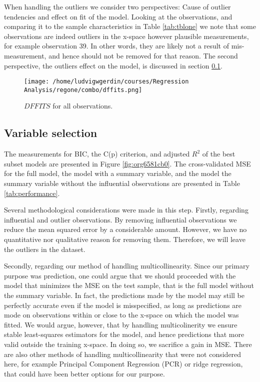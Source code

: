 \documentclass[11pt]{article}
\begin{document}
When handling the outliers we consider two perspectives: Cause of outlier tendencies and effect on fit of 
the model. Looking at the observations, and comparing it to the sample characteristics in Table \ref{tab:tblone}
we note that some observations are indeed outliers in the x-space however 
plausible measurements, for example observation 39. In other words, they are likely not a result
of mis-measurement, and hence should not be removed for that reason. The second perspective, the outliers 
effect on the model, is discussed in section \ref{sec:org46b9442}.

\begin{figure}[h]
\centering
\texttt{[image: /home/ludvigwgerdin/courses/Regression Analysis/regone/combo/dffits.png]}
\caption{\label{fig:org85084fd}
\(DFFITS\) for all observations.}
\end{figure}

\subsection{Variable selection}
\label{sec:org46b9442}

The measurements for BIC, the C(p) criterion, and adjusted \(R^2\) of the best subset models are presented
in Figure \ref{fig:org6581cb0}. The cross-validated MSE for the full model, the model with a summary variable, 
and the model the summary variable without the influential observations are presented in Table
\ref{tab:performance}. 

Several methodological considerations were made in this step. Firstly, regarding influential and outlier 
observations. By removing influential observations we reduce the mean squared error by a considerable amount.
However, we have no quantitative nor qualitative reason for removing them. Therefore, we will leave the 
outliers in the dataset. 

Secondly, regarding our method of handling multicollinearity. Since our primary purpose was prediction, 
one could argue that we should proceeded with the model that minimizes the MSE on the test sample, that is
the full model without the summary variable. In fact, the predictions made by the model may still be 
perfectly accurate even if the model is misspecified, as long as predictions are mode on observations within or
close to the x-space on which the model was fitted. \cite{Montgomery2012} We would argue, however, that by
handling multicolinerity we ensure stable least-squares estimators for the model, and hence predictions  
that more valid outside the training x-space. In doing so, we sacrifice a gain in MSE. 
There are also other methods of handling multicollinearity that were not considered here, for example
Principal Component Regression (PCR) or ridge regression, that could have been better 
options for our purpose.
\end{document}
